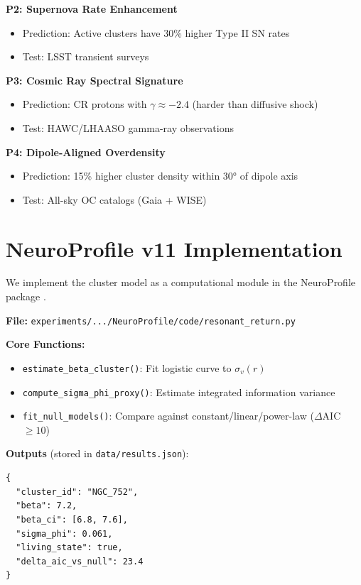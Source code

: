\documentclass[11pt,a4paper,twocolumn]{article}
\begin{document}
\textbf{P2: Supernova Rate Enhancement}
\begin{itemize}
    \item Prediction: Active clusters have 30\% higher Type II SN rates
    \item Test: LSST transient surveys
\end{itemize}

\textbf{P3: Cosmic Ray Spectral Signature}
\begin{itemize}
    \item Prediction: CR protons with $\gamma \approx -2.4$ (harder than diffusive shock)
    \item Test: HAWC/LHAASO gamma-ray observations
\end{itemize}

\textbf{P4: Dipole-Aligned Overdensity}
\begin{itemize}
    \item Prediction: 15\% higher cluster density within 30° of dipole axis
    \item Test: All-sky OC catalogs (Gaia + WISE)
\end{itemize}

\section{NeuroProfile v11 Implementation}

We implement the cluster model as a computational module in the NeuroProfile package \citep{romer2025neuro}.

\textbf{File:} \texttt{experiments/.../NeuroProfile/code/resonant\_return.py}

\textbf{Core Functions:}
\begin{itemize}
    \item \texttt{estimate\_beta\_cluster()}: Fit logistic curve to $\sigma_v(r)$
    \item \texttt{compute\_sigma\_phi\_proxy()}: Estimate integrated information variance
    \item \texttt{fit\_null\_models()}: Compare against constant/linear/power-law ($\Delta$AIC $\geq 10$)
\end{itemize}

\textbf{Outputs} (stored in \texttt{data/results.json}):
\begin{verbatim}
{
  "cluster_id": "NGC_752",
  "beta": 7.2,
  "beta_ci": [6.8, 7.6],
  "sigma_phi": 0.061,
  "living_state": true,
  "delta_aic_vs_null": 23.4
}
\end{verbatim}
\end{document}
